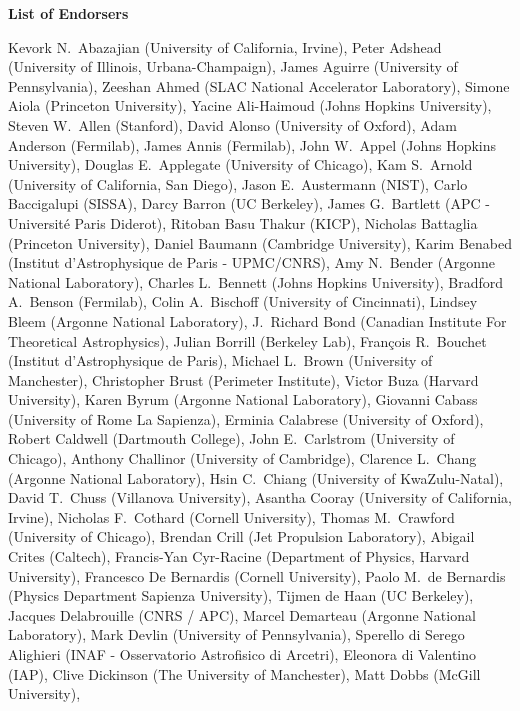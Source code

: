 \begin{center}
\textbf{List of Endorsers}
\end{center}
Kevork N.~Abazajian (University of California, Irvine),
Peter Adshead (University of Illinois, Urbana-Champaign),
James Aguirre (University of Pennsylvania),
Zeeshan Ahmed (SLAC National Accelerator Laboratory),
Simone Aiola (Princeton University),
Yacine Ali-Haimoud (Johns Hopkins University),
Steven W.~Allen (Stanford),
David Alonso (University of Oxford),
Adam Anderson (Fermilab),
James Annis (Fermilab),
John W.~Appel (Johns Hopkins University),
Douglas E.~Applegate (University of Chicago),
Kam S.~Arnold (University of California, San Diego),
Jason E.~Austermann (NIST),
Carlo Baccigalupi (SISSA),
Darcy Barron (UC Berkeley),
James G.~Bartlett (APC - Université Paris Diderot),
Ritoban Basu Thakur (KICP),
Nicholas Battaglia (Princeton University),
Daniel Baumann (Cambridge University),
Karim Benabed (Institut d'Astrophysique de Paris - UPMC/CNRS),
Amy N.~Bender (Argonne National Laboratory),
Charles L.~Bennett (Johns Hopkins University),
Bradford A.~Benson (Fermilab),
Colin A.~Bischoff (University of Cincinnati),
Lindsey Bleem (Argonne National Laboratory),
J.~Richard Bond (Canadian Institute For Theoretical Astrophysics),
Julian Borrill (Berkeley Lab),
François R.~Bouchet (Institut d'Astrophysique de Paris),
Michael L.~Brown (University of Manchester),
Christopher Brust (Perimeter Institute),
Victor Buza (Harvard University),
Karen Byrum (Argonne National Laboratory),
Giovanni Cabass (University of Rome La Sapienza),
Erminia Calabrese (University of Oxford),
Robert Caldwell (Dartmouth College),
John E.~Carlstrom (University of Chicago),
Anthony Challinor (University of Cambridge),
Clarence L.~Chang (Argonne National Laboratory),
Hsin C.~Chiang (University of KwaZulu-Natal),
David T.~Chuss (Villanova University),
Asantha Cooray (University of California, Irvine),
Nicholas F.~Cothard (Cornell University),
Thomas M.~Crawford (University of Chicago),
Brendan Crill (Jet Propulsion Laboratory),
Abigail Crites (Caltech),
Francis-Yan Cyr-Racine (Department of Physics, Harvard University),
Francesco De Bernardis (Cornell University),
Paolo M.~de Bernardis (Physics Department Sapienza University),
Tijmen de Haan (UC Berkeley),
Jacques Delabrouille (CNRS / APC),
Marcel Demarteau (Argonne National Laboratory),
Mark Devlin (University of Pennsylvania),
Sperello di Serego Alighieri (INAF - Osservatorio Astrofisico di Arcetri),
Eleonora di Valentino (IAP),
Clive Dickinson (The University of Manchester),
Matt Dobbs (McGill University),
